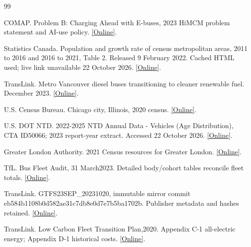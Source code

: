 \clearpage{}

\begin{thebibliography}{99}\raggedright

 COMAP. Problem B: Charging Ahead with E-buses, 2023 HiMCM problem statement and AI-use policy. \href{https://www.contest.comap.org/highschool/contests/himcm/2023_Problems/2023_HiMCM_Problem_B.pdf}{[Online]}.

 Statistics Canada. Population and growth rate of census metropolitan areas, 2011 to 2016 and 2016 to 2021, Table 2. Released 9 February 2022. Cached HTML used; live link unavailable 22 October 2026. \href{https://www150.statcan.gc.ca/n1/daily-quotidien/220209/t002a-eng.htm}{[Online]}.

 TransLink. Metro Vancouver diesel buses transitioning to cleaner renewable fuel. December 2023. \href{https://www.translink.ca/news/2023/december/metro%20vancouver%20diesel%20buses%20transitioning%20to%20cleaner%20renewable%20fuel}{[Online]}.

 U.S. Census Bureau. Chicago city, Illinois, 2020 census. \href{https://data.census.gov/profile/Chicago_city%3B_Illinois?g=160XX00US1714000}{[Online]}.

 U.S. DOT NTD. 2022-2025 NTD Annual Data - Vehicles (Age Distribution), CTA ID50066; 2023 report-year extract. Accessed 22 October 2026. \href{https://data.transportation.gov/d/6abt-uhgq}{[Online]}.

 Greater London Authority. 2021 Census resources for Greater London. \href{https://data.london.gov.uk/census}{[Online]}.

 TfL. Bus Fleet Audit, 31 March2023. Detailed body/cohort tables reconcile fleet totals. \href{https://content.tfl.gov.uk/fleet-annual-audit-report-31-march-2023.pdf}{[Online]}.

 TransLink. GTFS23SEP\_20231020, immutable mirror commit eb584b1108b0d582ae31c7db8e0d7e7b5ba1702b. Publisher metadata and hashes retained. \href{https://github.com/JaydenCWong/JAAM-project/tree/eb584b1108b0d582ae31c7db8e0d7e7b5ba1702b/backend/engine/translink_data}{[Online]}.

 TransLink. Low Carbon Fleet Transition Plan,2020. Appendix C-1 all-electric energy; Appendix D-1 historical costs. \href{https://www.translink.ca/-/media/translink/documents/about-translink/policies/translink_low_carbon_fleet_transition_plan_2020_02_24.pdf}{[Online]}.


\end{thebibliography}
